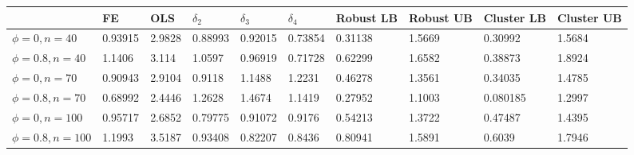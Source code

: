 \begin{tabular}{llllllllll}
& FE & OLS & $\delta_2$ & $\delta_3$ & $\delta_4$ & Robust LB & Robust UB & Cluster LB & Cluster UB \\ 
\hline 
$\phi=0,n=40$ & 0.93915 & 2.9828 & 0.88993 & 0.92015 & 0.73854 & 0.31138 & 1.5669 & 0.30992 & 1.5684 \\ 
$\phi=0.8,n=40$ & 1.1406 & 3.114 & 1.0597 & 0.96919 & 0.71728 & 0.62299 & 1.6582 & 0.38873 & 1.8924 \\ 
$\phi=0,n=70$ & 0.90943 & 2.9104 & 0.9118 & 1.1488 & 1.2231 & 0.46278 & 1.3561 & 0.34035 & 1.4785 \\ 
$\phi=0.8,n=70$ & 0.68992 & 2.4446 & 1.2628 & 1.4674 & 1.1419 & 0.27952 & 1.1003 & 0.080185 & 1.2997 \\ 
$\phi=0,n=100$ & 0.95717 & 2.6852 & 0.79775 & 0.91072 & 0.9176 & 0.54213 & 1.3722 & 0.47487 & 1.4395 \\ 
$\phi=0.8,n=100$ & 1.1993 & 3.5187 & 0.93408 & 0.82207 & 0.8436 & 0.80941 & 1.5891 & 0.6039 & 1.7946 \\ 
\hline 
\end{tabular}